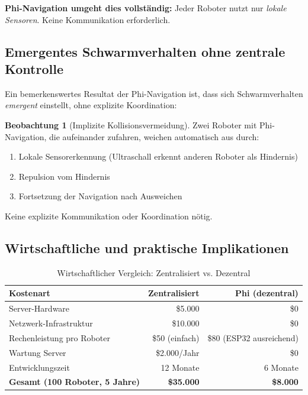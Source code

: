 ﻿\documentclass[a4paper,12pt]{article}
\theoremstyle{definition}
\newtheorem{beobachtung}{Beobachtung}
\begin{document}
\textbf{Phi-Navigation umgeht dies vollständig:} Jeder Roboter nutzt nur \emph{lokale Sensoren}. Keine Kommunikation erforderlich.

\subsection{Emergentes Schwarmverhalten ohne zentrale Kontrolle}

Ein bemerkenswertes Resultat der Phi-Navigation ist, dass sich Schwarmverhalten \emph{emergent} einstellt, ohne explizite Koordination:

\begin{beobachtung}[Implizite Kollisionsvermeidung]
	Zwei Roboter mit Phi-Navigation, die aufeinander zufahren, weichen automatisch aus durch:
	\begin{enumerate}
		\item Lokale Sensorerkennung (Ultraschall erkennt anderen Roboter als Hindernis)
		\item Repulsion vom Hindernis
		\item Fortsetzung der Navigation nach Ausweichen
	\end{enumerate}
	Keine explizite Kommunikation oder Koordination nötig.
\end{beobachtung}

\subsection{Wirtschaftliche und praktische Implikationen}

\begin{table}[H]
	\centering
	\caption{Wirtschaftlicher Vergleich: Zentralisiert vs. Dezentral}
	\label{tab:economic}
	\begin{tabular}{lrr}
		\toprule
		\textbf{Kostenart} & \textbf{Zentralisiert} & \textbf{Phi (dezentral)} \\
		\midrule
		Server-Hardware & \$5.000 & \$0 \\
		Netzwerk-Infrastruktur & \$10.000 & \$0 \\
		Rechenleistung pro Roboter & \$50 (einfach) & \$80 (ESP32 ausreichend) \\
		Wartung Server & \$2.000/Jahr & \$0 \\
		Entwicklungszeit & 12 Monate & 6 Monate \\
		\midrule
		\textbf{Gesamt (100 Roboter, 5 Jahre)} & \textbf{\$35.000} & \textbf{\$8.000} \\
		\bottomrule
	\end{tabular}
\end{table}
\end{document}
